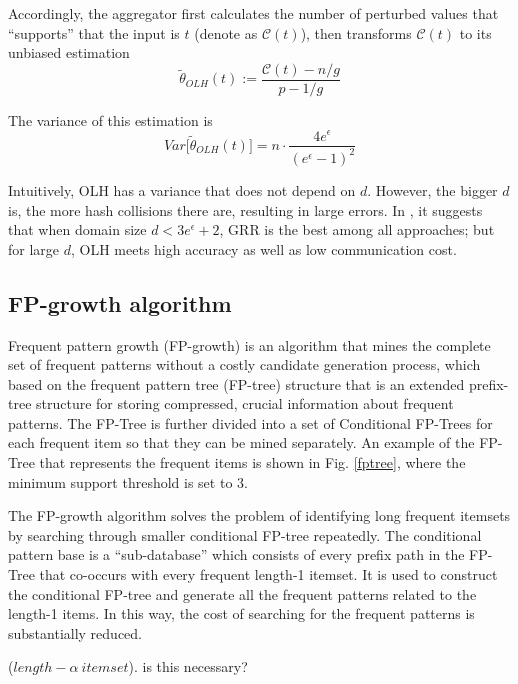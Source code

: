 \documentclass[conference]{IEEEtran}
\begin{document}
Accordingly, the aggregator first calculates the number of perturbed values that ``supports'' that the input is $t$ (denote as $\mathcal{C}(t)$), then transforms $\mathcal{C}(t)$ to its unbiased estimation
\begin{equation}
\tilde{\theta}_{OLH}(t) := \frac{\mathcal{C}(t) - n/g}{p-1/g}
\label{olh aggregate}
\end{equation}

The variance of this estimation is 
\begin{equation}
Var\big[\tilde{\theta}_{OLH}(t)\big] =n \cdot \frac{4e^{\epsilon}}{{(e^{\epsilon}-1)}^2}
\label{olh variance}
\end{equation}

Intuitively, OLH has a variance that does not depend on $d$. However, the bigger $d$ is, the more hash collisions there are, resulting in large errors. In \cite{a8}, it suggests that when domain size $d<3e^{\epsilon} +2$, GRR is the best among all approaches; but for large $d$, OLH meets high accuracy as well as low communication cost.

\subsection{FP-growth algorithm}
Frequent pattern growth (FP-growth)\cite{fp} is an algorithm that mines the complete set of frequent patterns without a costly candidate generation process, which based on the frequent pattern tree (FP-tree) structure that is an extended prefix-tree structure for storing compressed, crucial information about frequent patterns. The FP-Tree is further divided into a set of Conditional FP-Trees for each frequent item so that they can be mined separately. An example of the FP-Tree that represents the frequent items is shown in Fig. \ref{fptree}, where the minimum support threshold is set to 3.

The FP-growth algorithm solves the problem of identifying long frequent itemsets by searching through smaller conditional FP-tree repeatedly. The conditional pattern base is a “sub-database” which consists of every prefix path in the FP-Tree that co-occurs with every frequent length-1 itemset. It is used to construct the conditional FP-tree and generate all the frequent patterns related to the length-1 items. In this way, the cost of searching for the frequent patterns is substantially reduced.

\begin{Definition}
($length-\alpha \ itemset$).  {\color{red} is this necessary? }
\end{Definition}
\end{document}
